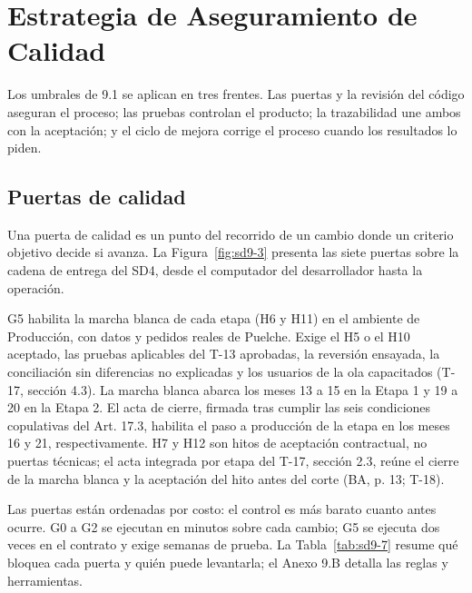 \section{Estrategia de Aseguramiento de Calidad}

Los umbrales de 9.1 se aplican en tres frentes. Las puertas y la revisión del código aseguran el proceso; las pruebas controlan el producto; la trazabilidad une ambos con la aceptación; y el ciclo de mejora corrige el proceso cuando los resultados lo piden.

\subsection{Puertas de calidad}

Una puerta de calidad es un punto del recorrido de un cambio donde un criterio objetivo decide si avanza. La Figura~\ref{fig:sd9-3} presenta las siete puertas sobre la cadena de entrega del SD4, desde el computador del desarrollador hasta la operación.


G5 habilita la marcha blanca de cada etapa (H6 y H11) en el ambiente de Producción, con datos y pedidos reales de Puelche. Exige el H5 o el H10 aceptado, las pruebas aplicables del T-13 aprobadas, la reversión ensayada, la conciliación sin diferencias no explicadas y los usuarios de la ola capacitados (T-17, sección 4.3). La marcha blanca abarca los meses 13 a 15 en la Etapa 1 y 19 a 20 en la Etapa 2. El acta de cierre, firmada tras cumplir las seis condiciones copulativas del Art. 17.3, habilita el paso a producción de la etapa en los meses 16 y 21, respectivamente. H7 y H12 son hitos de aceptación contractual, no puertas técnicas; el acta integrada por etapa del T-17, sección 2.3, reúne el cierre de la marcha blanca y la aceptación del hito antes del corte (BA, p. 13; T-18).

Las puertas están ordenadas por costo: el control es más barato cuanto antes ocurre. G0 a G2 se ejecutan en minutos sobre cada cambio; G5 se ejecuta dos veces en el contrato y exige semanas de prueba. La Tabla~\ref{tab:sd9-7} resume qué bloquea cada puerta y quién puede levantarla; el Anexo 9.B detalla las reglas y herramientas.

